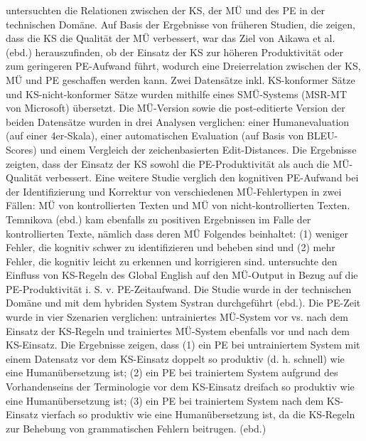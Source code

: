 \citet{AikawaEtAl2007} untersuchten die Relationen zwischen der KS, der MÜ und des PE in der technischen Domäne. Auf Basis der Ergebnisse von früheren Studien, die zeigen, dass die KS die Qualität der MÜ verbessert, war das Ziel von Aikawa et al. (ebd.) herauszufinden, ob der Einsatz der KS zur höheren Produktivität oder zum geringeren PE-Aufwand führt, wodurch eine Dreierrelation zwischen der KS, MÜ und PE geschaffen werden kann. Zwei Datensätze inkl. KS-konformer Sätze und KS-nicht-konformer Sätze wurden mithilfe eines SMÜ-Systems (MSR-MT von Microsoft) übersetzt. Die MÜ-Version sowie die post-editierte Version der beiden Datensätze wurden in drei Analysen verglichen: einer Humanevaluation (auf einer 4er-Skala), einer automatischen Evaluation (auf Basis von BLEU-Scores) und einem Vergleich der zeichenbasierten Edit-Distances. Die Ergebnisse zeigten, dass der Einsatz der KS sowohl die PE-Produktivität als auch die MÜ-Qualität verbessert. Eine weitere Studie \citep{Temnikova2010} verglich den kognitiven PE-Aufwand bei der Identifizierung und Korrektur von verschiedenen MÜ-Fehlertypen in zwei Fällen: MÜ von kontrollierten Texten und MÜ von nicht-kontrollierten Texten. Temnikova (ebd.) kam ebenfalls zu positiven Ergebnissen im Falle der kontrollierten Texte, nämlich dass deren MÜ Folgendes beinhaltet: (1) weniger Fehler, die kognitiv schwer zu identifizieren und beheben sind und (2) mehr Fehler, die kognitiv leicht zu erkennen und korrigieren sind. \citet{Thicke2011} untersuchte den Einfluss von KS-Regeln des Global English auf den MÜ-Output in Bezug auf die PE-Produktivität i. S. v. PE-Zeitaufwand. Die Studie wurde in der technischen Domäne und mit dem hybriden System Systran durchgeführt (ebd.). Die PE-Zeit wurde in vier Szenarien verglichen: untrainiertes MÜ-System vor vs. nach dem Einsatz der KS-Regeln und trainiertes MÜ-System ebenfalls vor und nach dem KS-Einsatz. Die Ergebnisse zeigen, dass (1) ein PE bei untrainiertem System mit einem Datensatz vor dem KS-Einsatz doppelt so produktiv (d. h. schnell) wie eine Humanübersetzung ist; (2) ein PE bei trainiertem System aufgrund des Vorhandenseins der Terminologie vor dem KS-Einsatz dreifach so produktiv wie eine Humanübersetzung ist; (3) ein PE bei trainiertem System nach dem KS-Einsatz vierfach so produktiv wie eine Humanübersetzung ist, da die KS-Regeln zur Behebung von grammatischen Fehlern beitrugen. (ebd.)


